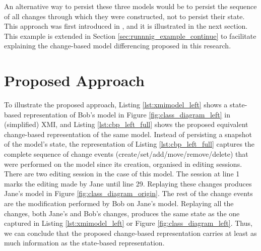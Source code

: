 An alternative way to persist these three models would be to persist the sequence of all changes through which they were constructed, not to persist their state. This approach was first introduced in \cite{DBLP:conf/models/YohannisKP17}, and it is illustrated in the next section. This example is extended in Section \ref{sec:runnnig_example_continue} to facilitate explaining the change-based model differencing proposed in this research.

\section{Proposed Approach}
\label{sec:proposed_approach}

To illustrate the proposed approach, Listing \ref{lst:xmimodel_left} shows a state-based representation of Bob’s model in Figure \ref{fig:class_diagram_left} in (simplified) XMI, and Listing \ref{lst:cbp_left_full} shows the proposed equivalent change-based representation of the same model. Instead of persisting a snapshot of the model’s state, the representation of Listing \ref{lst:cbp_left_full} captures the complete sequence of change events (create/set/add/move/remove/delete) that were performed on the model since its creation, organised in editing sessions. There are two editing session in the case of this model. The session at line 1 marks the editing made by Jane until line 29. Replaying these changes produces Jane’s model in Figure \ref{fig:class_diagram_origin}. The rest of the change events are the modification performed by Bob on Jane’s model. Replaying all the changes, both Jane’s and Bob’s changes, produces the same state as the one captured in Listing \ref{lst:xmimodel_left} or Figure \ref{fig:class_diagram_left}. Thus, we can conclude that the proposed change-based representation carries at least as much information as the state-based representation.

